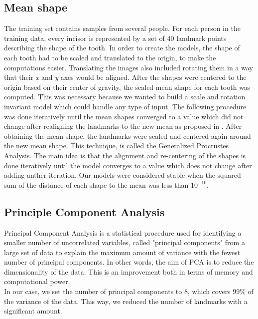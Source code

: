 \documentclass[a4paper]{article}
\begin{document}
\subsection{Mean shape} 

The training set contains samples from several people. For each person in the training data, every incisor is represented by a set of 40 landmark points describing the shape of the tooth. In order to create the models, the shape of each tooth had to be scaled and translated to the origin, to make the computations easier. Translating the images also included rotating them in a way that their \textit{x} and \textit{y} axes would be aligned. After the shapes were centered to the origin based on their center of gravity, the scaled mean shape for each tooth was computed. This was necessary because we wanted to build a scale and rotation invariant model which could handle any type of input. 
The following procedure was done iteratively until the mean shapes converged to a value which did not change after realigning the landmarks to the new mean as proposed in \cite{cootes1}. After obtaining the mean shape, the landmarks were scaled and centered again around the new mean shape. This technique, is called the Generalized Procrustes Analysis. The main idea is that the alignment and re-centering of the shapes is done iteratively until the model converges to a value which does not change after adding anther iteration. Our models were considered stable when the squared sum of the distance of each shape to the mean was less than $10^{-10}$.

\subsection{Principle Component Analysis}
Principal Component Analysis is a statistical procedure used for identifying a smaller number of uncorrelated variables, called "principal components" from a large set of data to explain the maximum amount of variance with the fewest number of principal components. In other words, the aim of PCA is to reduce the dimensionality of the data. This is an improvement both in terms of memory and computational power.\\
In our case, we set the number of principal components to 8, which covers 99\% of the variance of the data. This way, we reduced the number of landmarks with a significant amount.
\end{document}
